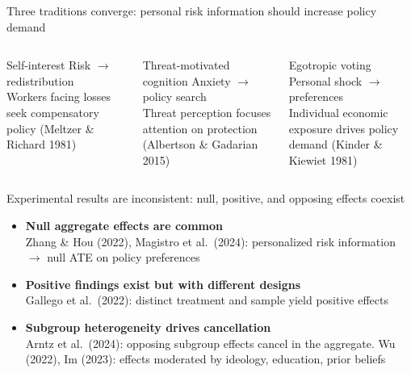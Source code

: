 \documentclass[aspectratio=169,11pt]{beamer}
\begin{document}
\begin{frame}{Three traditions converge: personal risk information should increase policy demand}

\begin{columns}[T]
\begin{alertblock}{Self-interest}
\centering Risk $\to$ redistribution \\[4pt]
{\small Workers facing losses seek compensatory policy (Meltzer \& Richard 1981)}
\end{alertblock}

\begin{alertblock}{Threat-motivated cognition}
\centering Anxiety $\to$ policy search \\[4pt]
{\small Threat perception focuses attention on protection (Albertson \& Gadarian 2015)}
\end{alertblock}

\begin{alertblock}{Egotropic voting}
\centering Personal shock $\to$ preferences \\[4pt]
{\small Individual economic exposure drives policy demand (Kinder \& Kiewiet 1981)}
\end{alertblock}
\end{columns}

\end{frame}

\begin{frame}{Experimental results are inconsistent: null, positive, and opposing effects coexist}

\begin{itemize}
    \item \textbf{Null aggregate effects are common} \\
    {\small Zhang \& Hou (2022), Magistro et al.\ (2024): personalized risk information $\to$ null ATE on policy preferences}
    \item \textbf{Positive findings exist but with different designs} \\
    {\small Gallego et al.\ (2022): distinct treatment and sample yield positive effects}
    \item \textbf{Subgroup heterogeneity drives cancellation} \\
    {\small Arntz et al.\ (2024): opposing subgroup effects cancel in the aggregate. Wu (2022), Im (2023): effects moderated by ideology, education, prior beliefs}
\end{itemize}

\end{frame}
\end{document}
